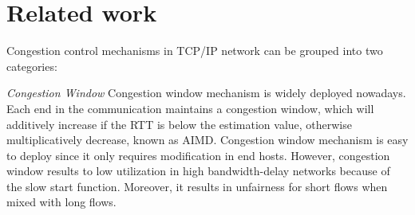 
\section{Related work}

\label{sec:related}




Congestion control mechanisms in TCP/IP network can be grouped into two categories:

\emph{Congestion Window} Congestion window mechanism is widely deployed nowadays. Each end in the communication maintains a congestion window, which will additively increase if the RTT is below the estimation value, otherwise multiplicatively decrease, known as AIMD\cite{TCP}. Congestion window mechanism is easy to deploy since it only requires modification in end hosts. However, congestion window results to low utilization in high bandwidth-delay networks because of the slow start function. Moreover, it results in unfairness for short flows when mixed with long flows.

